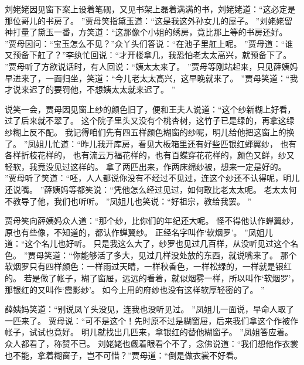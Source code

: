 刘姥姥因见窗下案上设着笔砚，又见书架上磊着满满的书，刘姥姥道：“这必定是那位哥儿的书房了。
”贾母笑指黛玉道：“这是我这外孙女儿的屋子。
”刘姥姥留神打量了黛玉一番，方笑道：“这那像个小姐的绣房，竟比那上等的书房还好。
”贾母因问：“宝玉怎么不见？”众丫头们答说：“在池子里舡上呢。
”贾母道：“谁又预备下舡了？”李纨忙回说：“才开楼拿几，我恐怕老太太高兴，就预备下了。
”贾母听了方欲说话时，有人回说：“姨太太来了。
”贾母等刚站起来，只见薛姨妈早进来了，一面归坐，笑道：“今儿老太太高兴，这早晚就来了。
”贾母笑道：“我才说来迟了的要罚他，不想姨太太就来迟了。
”\par
说笑一会，贾母因见窗上纱的颜色旧了，便和王夫人说道：“这个纱新糊上好看，过了后来就不翠了。
这个院子里头又没有个桃杏树，这竹子已是绿的，再拿这绿纱糊上反不配。
我记得咱们先有四五样颜色糊窗的纱呢，明儿给他把这窗上的换了。
”凤姐儿忙道：“昨儿我开库房，看见大板箱里还有好些匹银红蝉翼纱，
也有各样折枝花样的，
也有流云万福花样的，也有百蝶穿花花样的，颜色又鲜，纱又轻软，我竟没见过这样的。
拿了两匹出来，作两床绵纱被，想来一定是好的。
”贾母听了笑道：“呸，人人都说你没有不经过不见过，连这个纱还不认得呢，明儿还说嘴。
”薛姨妈等都笑说：“凭他怎么经过见过，如何敢比老太太呢。
老太太何不教导了他，我们也听听。
”凤姐儿也笑说：“好祖宗，教给我罢。
”\par
贾母笑向薛姨妈众人道：“那个纱，比你们的年纪还大呢。
怪不得他认作蝉翼纱，原也有些像，不知道的，都认作蝉翼纱。
正经名字叫作‘软烟罗’。
”凤姐儿道：“这个名儿也好听。
只是我这么大了，纱罗也见过几百样，从没听见过这个名色。
”贾母笑道：“你能够活了多大，见过几样没处放的东西，就说嘴来了。
那个软烟罗只有四样颜色：一样雨过天晴，一样秋香色，一样松绿的，一样就是银红的。
若是做了帐子，糊了窗屉，远远的看着，就似烟雾一样，所以叫作‘软烟罗’，那银红的又叫作‘霞影纱’。
如今上用的府纱也没有这样软厚轻密的了。
”
\par
薛姨妈笑道：“别说凤丫头没见，连我也没听见过。
”凤姐儿一面说，早命人取了一匹来了。
贾母说：“可不是这个！先时原不过是糊窗屉，后来我们拿这个作被作帐子，试试也竟好。
明儿就找出几匹来，拿银红的替他糊窗子。
”凤姐答应着。
众人都看了，称赞不已。
刘姥姥也觑着眼看个不了，念佛说道：“我们想他作衣裳也不能，拿着糊窗子，岂不可惜？”贾母道：“倒是做衣裳不好看。
